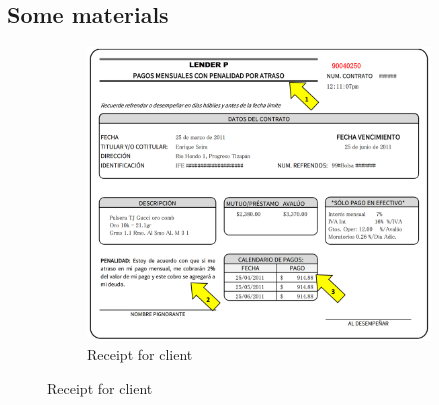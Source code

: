\documentclass[oneside,11pt]{article}
\begin{document}
\subsection{Some materials}

\vspace{.1in}
\begin{figure}[H]
     \caption{Contract Terms Summary, and Promise Slip}
    \label{PaperSlip}
    \begin{center}
    \begin{subfigure}{0.65\textwidth}
    \caption{Receipt for client}
        \centering
        \includegraphics[width=\textwidth]{Figuras/TicketLenderP.png}
    \end{subfigure}
    

\end{center}
\end{figure}
\end{document}
